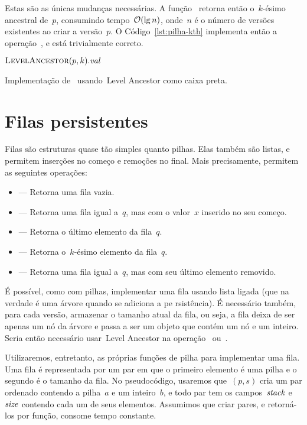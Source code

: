 \documentclass[../../main.tex]{subfiles}
\begin{document}
Estas são as únicas mudanças necessárias. A função~ retorna então o~\mbox{$k$-ésimo} ancestral de~$p$, consumindo tempo~$\mathcal{O}(\lg n)$, onde~$n$ é o número de versões existentes ao criar a versão~$p$.
O Código~\ref{lst:pilha-kth} implementa então a operação~, e está trivialmente correto.

\begin{algorithm}
\begin{algorithmic}[1]
    \State \Return $\Call{LevelAncestor}{p, k}.\V{val}$
\EndFunction
\end{algorithmic}
\caption{Implementação de~ usando~Level Ancestor como caixa preta.} \label{lst:pilha-kth}
\end{algorithm}

\section{Filas persistentes}

Filas são estruturas quase tão simples quanto pilhas. Elas também são listas, e permitem inserções no começo e remoções no final. Mais precisamente, permitem as seguintes operações:

\begin{itemize}
	\item {} --- Retorna uma fila vazia.
	\item {} --- Retorna uma fila igual a~$q$, mas com o valor~$x$ inserido no seu começo.
	\item {} --- Retorna o último elemento da fila~$q$.
	\item {} --- Retorna o~\mbox{$k$-ésimo} elemento da fila~$q$.
	\item {} --- Retorna uma fila igual a~$q$, mas com seu último elemento removido.
\end{itemize}

É possível, como com pilhas, implementar uma fila usando lista ligada (que na verdade é uma árvore quando se adiciona a pe
rsistência). É necessário também, para cada versão, armazenar o tamanho atual da fila, ou seja, a fila deixa de ser apenas um nó da árvore e passa a ser um objeto que contém um nó e um inteiro. Seria então necessário usar~Level Ancestor na operação~ ou~.

Utilizaremos, entretanto, as próprias funções de pilha para implementar uma fila. Uma fila é representada por um par em que o primeiro elemento é uma pilha e o segundo é o tamanho da fila. No pseudocódigo, usaremos que~$(p,s)$ cria um par ordenado contendo a pilha~$a$ e um inteiro~$b$, e todo par tem os campos~$\mathit{stack}$ e~$\mathit{size}$ contendo cada um de seus elementos.
Assumimos que criar pares, e retorná-los por função, consome tempo constante.
\end{document}
